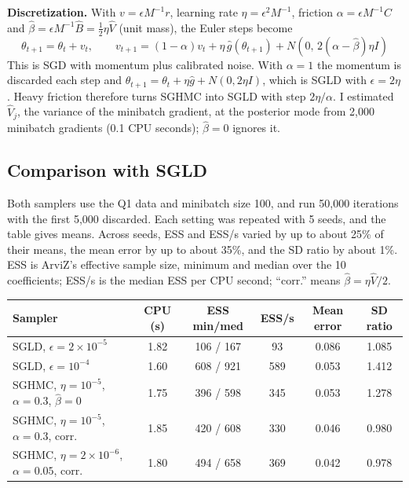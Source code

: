 \documentclass[11pt]{article}
\begin{document}
\textbf{Discretization.} With $v=\epsilon M^{-1}r$, learning rate $\eta=\epsilon^2M^{-1}$, friction
$\alpha=\epsilon M^{-1}C$ and $\hat\beta=\epsilon M^{-1}\hat B=\frac12\eta\hat V$ (unit mass), the Euler steps
become
\[
\boxed{\;\theta_{t+1}=\theta_t+v_t,\qquad
v_{t+1}=(1-\alpha)v_t+\eta\,\hat g(\theta_{t+1})+N\!\left(0,\,2(\alpha-\hat\beta)\eta I\right)\;}
\]
This is SGD with momentum plus calibrated noise. With $\alpha=1$ the momentum is discarded each step and
$\theta_{t+1}=\theta_t+\eta\hat g+N(0,2\eta I)$, which is SGLD with $\epsilon=2\eta$. Heavy friction
therefore turns SGHMC into SGLD with step $2\eta/\alpha$. I estimated $\hat V_j$, the variance of the
minibatch gradient, at the posterior mode from 2,000 minibatch gradients (0.1 CPU seconds); $\hat\beta=0$
ignores it.

\subsection*{Comparison with SGLD}

Both samplers use the Q1 data and minibatch size 100, and run 50,000 iterations with the first 5,000
discarded. Each setting was repeated with 5 seeds, and the table gives means. Across seeds, ESS and ESS/s
varied by up to about 25\% of their means, the mean error by up to about 35\%, and the SD ratio by about 1\%. ESS is ArviZ's effective sample size, minimum and median
over the 10 coefficients; ESS/s is the median ESS per CPU second; ``corr.'' means $\hat\beta=\eta\hat V/2$.

\begin{center}
\small
\setlength{\tabcolsep}{5pt}
\begin{tabular}{lccccc}
\toprule
\textbf{Sampler} & \textbf{CPU (s)} & \textbf{ESS min/med} & \textbf{ESS/s} & \textbf{Mean error} & \textbf{SD ratio} \\
\midrule
SGLD, $\epsilon=2\times10^{-5}$ & 1.82 & 106 / 167 & 93 & 0.086 & 1.085 \\
SGLD, $\epsilon=10^{-4}$ & 1.60 & 608 / 921 & 589 & 0.053 & 1.412 \\
SGHMC, $\eta=10^{-5}$, $\alpha=0.3$, $\hat\beta=0$ & 1.75 & 396 / 598 & 345 & 0.053 & 1.278 \\
SGHMC, $\eta=10^{-5}$, $\alpha=0.3$, corr. & 1.85 & 420 / 608 & 330 & 0.046 & 0.980 \\
SGHMC, $\eta=2\times10^{-6}$, $\alpha=0.05$, corr. & 1.80 & 494 / 658 & 369 & 0.042 & 0.978 \\
\bottomrule
\end{tabular}
\end{center}
\end{document}

